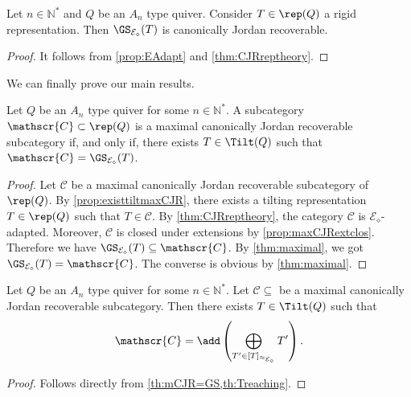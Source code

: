 \begin{prop}
\label{propGSCJR}
 Let $n \in \mathbb{N}^*$ and $Q$ be an $A_n$ type quiver. Consider $T \in \rep(Q)$ a rigid representation. Then $\GS_{\mathcal{E_\diamond}}(T)$ is canonically Jordan recoverable.
\end{prop}

\begin{proof}
It follows from \cref{prop:EAdapt} and \cref{thm:CJRreptheory}.
\end{proof}

We can finally prove our main results.

\begin{theorem}
\label{th:mCJR=GS}
Let $Q$ be an $A_n$ type quiver for some $n \in \mathbb{N}^*$. A subcategory $\mathscr{C} \subset \rep(Q)$ is a maximal canonically Jordan recoverable subcategory if, and only if, there exists $T \in \Tilt(Q)$ such that $\mathscr{C} = \GS_{\mathcal{E_\diamond}}(T)$.
\end{theorem}

\begin{proof}
Let $\mathscr{C}$ be a maximal canonically Jordan recoverable subcategory of $\rep(Q)$. By \cref{prop:existtiltmaxCJR}, there exists a tilting representation $T \in \rep(Q)$ such that $T \in \mathscr{C}$. By \cref{thm:CJRreptheory}, the category $\mathscr{C}$ is $\mathcal{E}_\diamond$-adapted. Moreover, $\mathscr{C}$ is closed under extensions by \cref{prop:maxCJRextclos}. Therefore we have $\GS_{\mathcal{E}_{\diamond}}(T) \subseteq \mathscr{C}$. By \cref{thm:maximal}, we got $\GS_{\mathcal{E}_\diamond}(T) = \mathscr{C}$. The converse is obvious by \cref{thm:maximal}.
\end{proof}

\begin{cor}
Let $Q$ be an $A_n$ type quiver for some $n \in \mathbb{N}^*$. Let $\mathscr{C} \subseteq$ be a maximal canonically Jordan recoverable subcategory. Then there exists $T \in \Tilt(Q)$ such that \[\mathscr{C} = \add \left( \bigoplus_{T' \in [T]_{\approx_{\mathcal{E}_\diamond}}} T' \right). \]
\end{cor}

\begin{proof}
Follows directly from \cref{th:mCJR=GS,th:Treaching}.
\end{proof}
